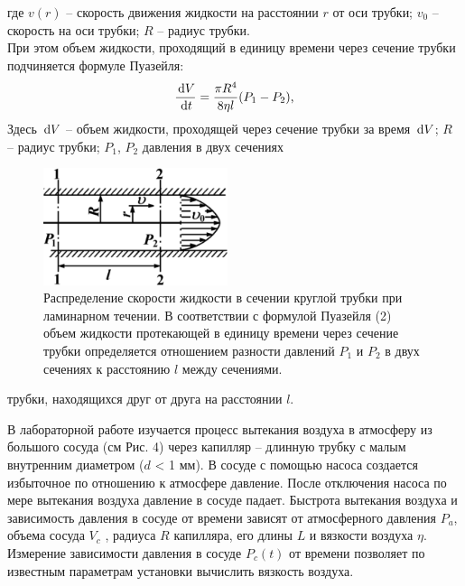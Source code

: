 \documentclass[a4paper]{article}
\begin{document}
где $v(r)$ – скорость движения жидкости на расстоянии $r$ от оси
трубки; $v_0$ – скорость на оси трубки; $R$ – радиус трубки.\\
При этом объем жидкости, проходящий в единицу времени
через сечение трубки подчиняется формуле Пуазейля:
\begin{equation}
    \dfrac{\dl V}{\dl t} = \dfrac{\pi R^4}{8 \eta l }(P_1 - P_2)\text{,}
\end{equation}
Здесь $\dl V$ – объем жидкости, проходящей через сечение трубки
за время $\dl V$; $R$ – радиус трубки; $P_1$, $P_2$ давления в двух сечениях
\begin{figure}[H]
    \begin{center}
    \includegraphics[width=0.48\textwidth]{pick_2}
    \caption{Распределение скорости жидкости в сечении круглой трубки
при ламинарном течении. В соответствии с формулой Пуазейля (2)
объем жидкости протекающей в единицу времени через сечение
трубки определяется отношением разности давлений $P_1$ и $P_2$ в двух
сечениях к расстоянию $l$ между сечениями.}
\end{center}
\end{figure}

трубки, находящихся друг от друга на расстоянии $l$.

В лабораторной работе изучается процесс вытекания воздуха
в атмосферу из большого сосуда (см Рис. 4) через капилляр –
длинную трубку с малым внутренним диаметром ($d$ < 1 мм). В
сосуде с помощью насоса создается избыточное по отношению
к атмосфере давление. После отключения насоса по мере вытекания воздуха давление в сосуде падает. Быстрота вытекания
воздуха и зависимость давления в сосуде от времени зависят от
атмосферного давления $P_a$, объема сосуда $V_c$ , радиуса $R$ капилляра, его длины $L$ и вязкости воздуха $\eta$. Измерение зависимости
давления в сосуде $P_c(t)$ от времени позволяет по известным параметрам установки вычислить вязкость воздуха.\\
\end{document}
